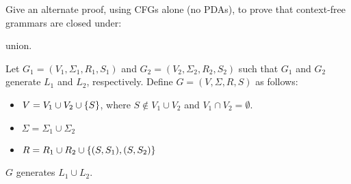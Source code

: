 \begin{problem}
  Give an alternate proof, using CFGs alone (no PDAs),
  to prove that context-free grammars are closed under:
  \begin{enumalph}
    \item union.
    \begin{Answer}
      Let $G_1 = (V_1, \Sigma_1, R_1, S_1)$ and $G_2 = (V_2, \Sigma_2, R_2, S_2)$
      such that $G_1$ and $G_2$ generate $L_1$ and $L_2$, respectively.
      Define $G = (V, \Sigma, R, S)$ as follows:
      \begin{itemize}
        \item $V = V_1 \cup V_2 \cup \left\{S\right\}$, where $S \notin V_1 \cup V_2$ and $V_1 \cap V_2 = \emptyset$.
        \item $\Sigma = \Sigma_1 \cup \Sigma_2$
        \item $R = R_1 \cup R_2 \cup \left\{(S, S_1), (S, S_2)\right\}$
      \end{itemize}
      \begin{claim}
        $G$ generates $L_1 \cup L_2$.


\end{claim}
\end{Answer}
\end{enumalph}
\end{problem}
